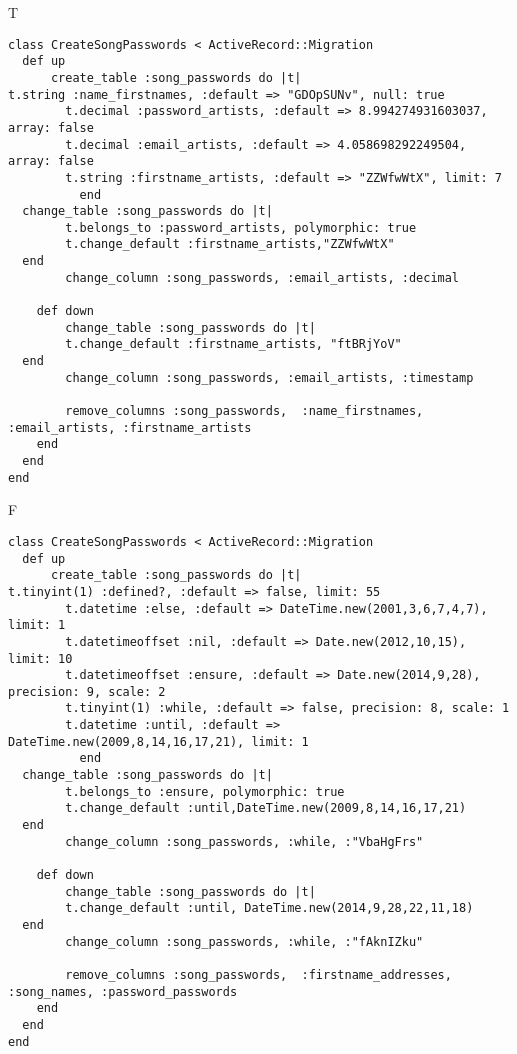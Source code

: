 T
\begin{verbatim}
class CreateSongPasswords < ActiveRecord::Migration
  def up
	  create_table :song_passwords do |t|
t.string :name_firstnames, :default => "GDOpSUNv", null: true
		t.decimal :password_artists, :default => 8.994274931603037, array: false
		t.decimal :email_artists, :default => 4.058698292249504, array: false
		t.string :firstname_artists, :default => "ZZWfwWtX", limit: 7
		  end
  change_table :song_passwords do |t|
		t.belongs_to :password_artists, polymorphic: true
 		t.change_default :firstname_artists,"ZZWfwWtX"
  end
 		change_column :song_passwords, :email_artists, :decimal
   
	def down
		change_table :song_passwords do |t|
		t.change_default :firstname_artists, "ftBRjYoV"
  end
 		change_column :song_passwords, :email_artists, :timestamp
   
		remove_columns :song_passwords,  :name_firstnames, :email_artists, :firstname_artists 
    end 
  end
end

\end{verbatim}

F
\begin{verbatim}
class CreateSongPasswords < ActiveRecord::Migration
  def up
	  create_table :song_passwords do |t|
t.tinyint(1) :defined?, :default => false, limit: 55
		t.datetime :else, :default => DateTime.new(2001,3,6,7,4,7), limit: 1
		t.datetimeoffset :nil, :default => Date.new(2012,10,15), limit: 10
		t.datetimeoffset :ensure, :default => Date.new(2014,9,28), precision: 9, scale: 2
		t.tinyint(1) :while, :default => false, precision: 8, scale: 1
		t.datetime :until, :default => DateTime.new(2009,8,14,16,17,21), limit: 1
		  end
  change_table :song_passwords do |t|
		t.belongs_to :ensure, polymorphic: true
 		t.change_default :until,DateTime.new(2009,8,14,16,17,21)
  end
 		change_column :song_passwords, :while, :"VbaHgFrs"
   
	def down
		change_table :song_passwords do |t|
		t.change_default :until, DateTime.new(2014,9,28,22,11,18)
  end
 		change_column :song_passwords, :while, :"fAknIZku"
   
		remove_columns :song_passwords,  :firstname_addresses, :song_names, :password_passwords 
    end 
  end
end

\end{verbatim}

